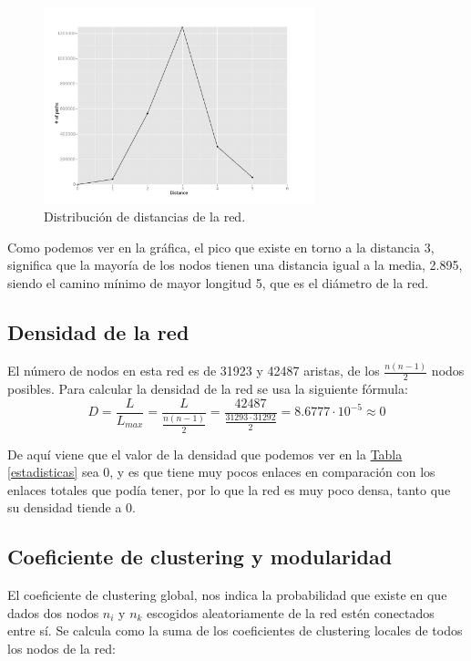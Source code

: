 \documentclass[paper=a4, fontsize=11pt]{article} %
\numberwithin{equation}{section} %
\numberwithin{figure}{section} %
\numberwithin{table}{section} %
\begin{document}
\begin{figure}[H]
  \centering
  \includegraphics[width=0.7\textwidth]{img/dist_hist}
  \caption{Distribución de distancias de la red.}
  \label{im2}
\end{figure}

Como podemos ver en la gráfica, el pico que existe en torno a la distancia 3, significa que la mayoría de los nodos tienen una distancia igual a la media, 2.895, siendo el camino mínimo de mayor longitud 5, que es el diámetro de la red.

\subsection{Densidad de la red}

El número de nodos en esta red es de 31923 y 42487 aristas, de los $\frac{n(n-1)}{2}$ nodos posibles. Para calcular la densidad de la red se usa la siguiente fórmula:
\begin{displaymath}
    D = \frac{L}{L_{max}} = \frac{L}{\frac{n(n-1)}{2}} = \frac{42487}{\frac{31293\cdot31292}{2}} = 8.6777\cdot10^{-5} \approx 0
\end{displaymath}

De aquí viene que el valor de la densidad que podemos ver en la \hyperref[estadisticas]{Tabla \ref*{estadisticas}} sea 0, y es que tiene muy pocos enlaces en comparación con los enlaces totales que podía tener, por lo que la red es muy poco densa, tanto que su densidad tiende a 0.

\subsection{Coeficiente de clustering y modularidad}

El coeficiente de clustering global, nos indica la probabilidad que existe en que dados dos nodos $n_i$ y $n_k$ escogidos aleatoriamente de la red estén conectados entre sí. Se calcula como la suma de los coeficientes de clustering locales de todos los nodos de la red:
\end{document}
